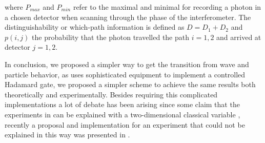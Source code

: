 \documentclass[12pt]{book}
\begin{document}
where $P_{max}$ and $P_{min}$ refer to the maximal and minimal for recording a photon in a chosen detector when scanning through the phase of the interferometer. The distinguishability or which-path information is defined as $D=D_{1}+D_{2}$ and $p(i,j)$ the probability that the photon travelled the path $i=1,2$ and arrived at detector $j=1,2$.

In conclusion, we proposed a simpler way to get the transition from wave and particle behavior, as \cite{Kaiser2012,Peruzzo} uses sophisticated equipment to implement a controlled Hadamard gate, we proposed a simpler scheme to achieve the same results both theoretically and experimentally. Besides requiring this complicated implementations a lot of debate has been arising since some claim that the experiments in \cite{Peruzzo,Kaiser2012}  can be explained with a two-dimensional classical variable \cite{Rossi,Chaves}, recently a proposal and implementation for an experiment that could not be explained in this way was presented in \cite{Polino}.
\end{document}
